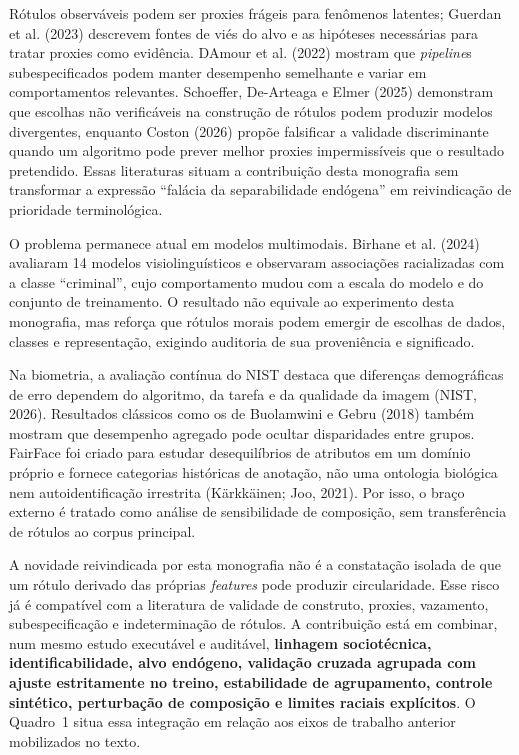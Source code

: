 Rótulos observáveis podem ser proxies frágeis para fenômenos latentes; Guerdan et al. (2023) descrevem fontes de viés do alvo e as hipóteses necessárias para tratar proxies como evidência. D\textquotesingle Amour et al. (2022) mostram que \emph{pipeline}s subespecificados podem manter desempenho semelhante e variar em comportamentos relevantes. Schoeffer, De-Arteaga e Elmer (2025) demonstram que escolhas não verificáveis na construção de rótulos podem produzir modelos divergentes, enquanto Coston (2026) propõe falsificar a validade discriminante quando um algoritmo pode prever melhor proxies impermissíveis que o resultado pretendido. Essas literaturas situam a contribuição desta monografia sem transformar a expressão ``falácia da separabilidade endógena'' em reivindicação de prioridade terminológica.

O problema permanece atual em modelos multimodais. Birhane et al. (2024) avaliaram 14 modelos visiolinguísticos e observaram associações racializadas com a classe ``criminal'', cujo comportamento mudou com a escala do modelo e do conjunto de treinamento. O resultado não equivale ao experimento desta monografia, mas reforça que rótulos morais podem emergir de escolhas de dados, classes e representação, exigindo auditoria de sua proveniência e significado.

Na biometria, a avaliação contínua do NIST destaca que diferenças demográficas de erro dependem do algoritmo, da tarefa e da qualidade da imagem (NIST, 2026). Resultados clássicos como os de Buolamwini e Gebru (2018) também mostram que desempenho agregado pode ocultar disparidades entre grupos. FairFace foi criado para estudar desequilíbrios de atributos em um domínio próprio e fornece categorias históricas de anotação, não uma ontologia biológica nem autoidentificação irrestrita (Kärkkäinen; Joo, 2021). Por isso, o braço externo é tratado como análise de sensibilidade de composição, sem transferência de rótulos ao corpus principal.

A novidade reivindicada por esta monografia não é a constatação isolada de que um rótulo derivado das próprias \emph{features} pode produzir circularidade. Esse risco já é compatível com a literatura de validade de construto, proxies, vazamento, subespecificação e indeterminação de rótulos. A contribuição está em combinar, num mesmo estudo executável e auditável, \textbf{linhagem sociotécnica, identificabilidade, alvo endógeno, validação cruzada agrupada com ajuste estritamente no treino, estabilidade de agrupamento, controle sintético, perturbação de composição e limites raciais explícitos}. O Quadro~1 situa essa integração em relação aos eixos de trabalho anterior mobilizados no texto.

